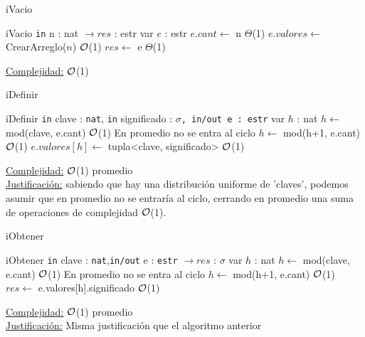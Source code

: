 \begin{Algoritmos}
	
	\begin{algorithm}
		\caption{iVacio}
		\begin{algorithmic}
			\Procedure
			{iVacio}
			{\texttt{in} n : nat} $\to res$ : estr
				\State var $e$ : estr
				\State $e.cant \gets$ n \Comment $\Theta$(1)
				\State $e.valores \gets$ CrearArreglo($n$) \Comment $\mathcal{O}$(1)
				\State $res \gets$ e \Comment $\Theta$(1)
			\EndProcedure
		\end{algorithmic}
		\underline{Complejidad:} $\mathcal{O}$(1)
	\end{algorithm}
	
	\begin{algorithm}
		\caption{iDefinir}
		\begin{algorithmic}
			\Procedure
			{iDefinir}
			{\texttt{in} clave : \texttt{nat}, \texttt{in} significado : \texttt{$\sigma$, \texttt{in/out} e : \texttt{estr}}}
				\State var $h$ : nat
				\State $h \gets$ mod(clave, e.cant) \Comment $\mathcal{O}$(1)
				 \Comment En promedio no se entra al ciclo
						\State $h \gets$ mod(h+1, e.cant) \Comment $\mathcal{O}$(1)
				\EndWhile
				\State $e.valores[h] \gets$ tupla<clave, significado> \Comment $\mathcal{O}$(1)
			\EndProcedure
		\end{algorithmic}
		\underline{Complejidad:} $\mathcal{O}$(1) promedio
		\\
		\underline{Justificación:} sabiendo que hay una distribución uniforme de 'claves', podemos asumir que en promedio no se entraría al ciclo, cerrando en promedio una suma de operaciones de complejidad $\mathcal{O}$(1).
	\end{algorithm}
	
	\begin{algorithm}
		\caption{iObtener}
		\begin{algorithmic}
			\Procedure
			{iObtener}
			{\texttt{in} clave : \texttt{nat},\texttt{in/out} e : \texttt{estr}} $\to res$ : $\sigma$
				\State var $h$ : nat				
				\State $h \gets$ mod(clave, e.cant) \Comment $\mathcal{O}$(1)
				\While{e.valores[h].clave $\neq$ clave} 
				\Comment En promedio no se entra al ciclo
					\State $h \gets$  mod(h+1, e.cant) \Comment $\mathcal{O}$(1)
				\EndWhile
				\State $res \gets$ e.valores[h].significado \Comment $\mathcal{O}$(1)
			\EndProcedure
		\end{algorithmic}
		\underline{Complejidad:} $\mathcal{O}$(1) promedio \\
		\underline{Justificación:} Misma justificación que el algoritmo anterior
	\end{algorithm}
	
\end{Algoritmos}